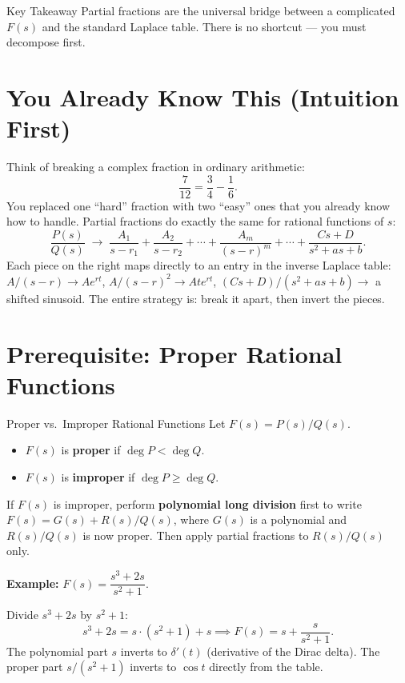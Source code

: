 \documentclass[12pt,a4paper]{article}
\begin{document}
\begin{learnbox}{Key Takeaway}
Partial fractions are the universal bridge between a complicated $F(s)$ and
the standard Laplace table. There is no shortcut --- you must decompose first.
\end{learnbox}

\section{You Already Know This (Intuition First)}
Think of breaking a complex fraction in ordinary arithmetic:
\[
  \frac{7}{12} = \frac{3}{4} - \frac{1}{6}.
\]
You replaced one ``hard'' fraction with two ``easy'' ones that you already
know how to handle. Partial fractions do exactly the same for rational
functions of $s$:
\[
  \frac{P(s)}{Q(s)} \;\longrightarrow\;
  \frac{A_1}{s-r_1} + \frac{A_2}{s-r_2} + \cdots
  + \frac{A_m}{(s-r)^m} + \cdots + \frac{Cs+D}{s^2+as+b}.
\]
Each piece on the right maps directly to an entry in the inverse Laplace
table: $A/(s-r)\to Ae^{rt}$, $A/(s-r)^2\to Ate^{rt}$,
$(Cs+D)/(s^2+as+b)\to$ a shifted sinusoid.
The entire strategy is: break it apart, then invert the pieces.

\section{Prerequisite: Proper Rational Functions}
\begin{infobox}{Proper vs.~Improper Rational Functions}
Let $F(s) = P(s)/Q(s)$.
\begin{itemize}[noitemsep]
  \item $F(s)$ is \textbf{proper} if $\deg P < \deg Q$.
  \item $F(s)$ is \textbf{improper} if $\deg P \geq \deg Q$.
\end{itemize}
If $F(s)$ is improper, perform \textbf{polynomial long division} first to
write $F(s) = G(s) + R(s)/Q(s)$, where $G(s)$ is a polynomial and
$R(s)/Q(s)$ is now proper. Then apply partial fractions to $R(s)/Q(s)$ only.

\medskip
\textbf{Example:} $F(s) = \dfrac{s^3 + 2s}{s^2 + 1}$.

Divide $s^3 + 2s$ by $s^2 + 1$:
\[
  s^3 + 2s = s\cdot(s^2+1) + s \implies F(s) = s + \frac{s}{s^2+1}.
\]
The polynomial part $s$ inverts to $\delta'(t)$ (derivative of the Dirac
delta). The proper part $s/(s^2+1)$ inverts to $\cos t$ directly from
the table.
\end{infobox}
\end{document}
